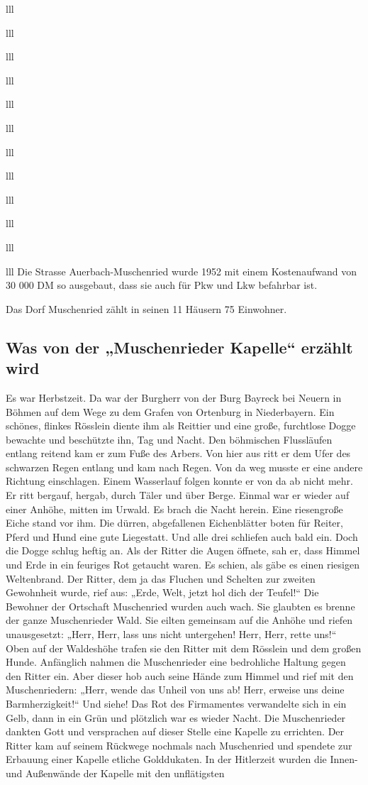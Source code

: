 \documentclass[12pt,a4pager]{book}
\begin{document}
\begin{tabuluar}{lll}
\begin{tabuluar}{lll}
\begin{tabuluar}{lll}
\begin{tabuluar}{lll}
\begin{tabuluar}{lll}
\begin{tabuluar}{lll}
\begin{tabuluar}{lll}
\begin{tabuluar}{lll}
\begin{tabuluar}{lll}
\begin{tabuluar}{lll}
\begin{tabuluar}{lll}
\begin{tabuluar}{lll}
Die Strasse Auerbach-Muschenried wurde 1952 mit einem Kostenaufwand von 30 000
DM so ausgebaut, dass sie auch für Pkw und Lkw befahrbar ist.

Das Dorf Muschenried zählt in seinen 11 Häusern 75 Einwohner.

\subsection{Was von der „Muschenrieder Kapelle“ erzählt wird}

Es war Herbstzeit. Da war der Burgherr von der Burg Bayreck bei Neuern in Böhmen
auf dem Wege zu dem Grafen von Ortenburg in Niederbayern. Ein schönes, flinkes
Rösslein diente ihm als Reittier und eine große, furchtlose Dogge bewachte und
beschützte ihn, Tag und Nacht. Den böhmischen Flussläufen entlang reitend kam er
zum Fuße des Arbers. Von hier aus ritt er dem Ufer des schwarzen Regen entlang
und kam nach Regen. Von da weg musste er eine andere Richtung einschlagen. Einem
Wasserlauf folgen konnte er von da ab nicht mehr. Er ritt bergauf, hergab, durch
Täler und über Berge. Einmal war er wieder auf einer Anhöhe, mitten im Urwald.
Es brach die Nacht herein. Eine riesengroße Eiche stand vor ihm. Die dürren,
abgefallenen Eichenblätter boten für Reiter, Pferd und Hund eine gute
Liegestatt. Und alle drei schliefen auch bald ein. Doch die Dogge schlug heftig
an. Als der Ritter die Augen öffnete, sah er, dass Himmel und Erde in ein
feuriges Rot getaucht waren. Es schien, als gäbe es einen riesigen Weltenbrand.
Der Ritter, dem ja das Fluchen und Schelten zur zweiten Gewohnheit wurde, rief
aus: „Erde, Welt, jetzt hol dich der Teufel!“ Die Bewohner der Ortschaft
Muschenried wurden auch wach. Sie glaubten es brenne der ganze Muschenrieder
Wald. Sie eilten gemeinsam auf die Anhöhe und riefen unausgesetzt: „Herr, Herr,
lass uns nicht untergehen! Herr, Herr, rette uns!“ Oben auf der Waldeshöhe
trafen sie den Ritter mit dem Rösslein und dem großen Hunde. Anfänglich nahmen
die Muschenrieder eine bedrohliche Haltung gegen den Ritter ein. Aber dieser hob
auch seine Hände zum Himmel und rief mit den Muschenriedern: „Herr, wende das
Unheil von uns ab! Herr, erweise uns deine Barmherzigkeit!“ Und siehe! Das Rot
des Firmamentes verwandelte sich in ein Gelb, dann in ein Grün und plötzlich war
es wieder Nacht. Die Muschenrieder dankten Gott und versprachen auf dieser
Stelle eine Kapelle zu errichten. Der Ritter kam auf seinem Rückwege nochmals
nach Muschenried und spendete zur Erbauung einer Kapelle etliche Golddukaten. In
der Hitlerzeit wurden die Innen- und Außenwände der Kapelle mit den unflätigsten

\end{tabuluar}
\end{tabuluar}
\end{tabuluar}
\end{tabuluar}
\end{tabuluar}
\end{tabuluar}
\end{tabuluar}
\end{tabuluar}
\end{tabuluar}
\end{tabuluar}
\end{tabuluar}
\end{tabuluar}
\end{document}
